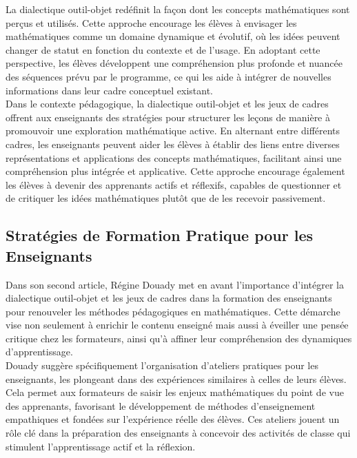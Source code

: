 La dialectique outil-objet redéfinit la façon dont les concepts mathématiques sont perçus et utilisés.
Cette approche encourage les élèves à envisager les mathématiques comme un domaine dynamique et évolutif,
où les idées peuvent changer de statut en fonction du contexte et de l'usage.
En adoptant cette perspective,
les élèves développent une compréhension plus profonde et nuancée des séquences prévu par le programme,
ce qui les aide à intégrer de nouvelles informations dans leur cadre conceptuel existant.\\

Dans le contexte pédagogique,
la dialectique outil-objet et les jeux de cadres offrent aux enseignants des stratégies pour structurer les leçons de manière à promouvoir une exploration mathématique active.
En alternant entre différents cadres,
les enseignants peuvent aider les élèves à établir des liens entre diverses représentations et applications des concepts mathématiques,
facilitant ainsi une compréhension plus intégrée et applicative.
Cette approche encourage également les élèves à devenir des apprenants actifs et réflexifs,
capables de questionner et de critiquer les idées mathématiques plutôt que de les recevoir passivement.

\subsection{Stratégies de Formation Pratique pour les Enseignants}

Dans son second article,
Régine Douady met en avant l'importance d'intégrer la dialectique outil-objet et les jeux de cadres dans la formation des enseignants pour renouveler les méthodes pédagogiques en mathématiques.
Cette démarche vise non seulement à enrichir le contenu enseigné mais aussi à éveiller une pensée critique chez les formateurs,
ainsi qu'à affiner leur compréhension des dynamiques d'apprentissage.\\

Douady suggère spécifiquement l'organisation d'ateliers pratiques pour les enseignants,
les plongeant dans des expériences similaires à celles de leurs élèves.
Cela permet aux formateurs de saisir les enjeux mathématiques du point de vue des apprenants,
favorisant le développement de méthodes d'enseignement empathiques et fondées sur l'expérience réelle des élèves.
Ces ateliers jouent un rôle clé dans la préparation des enseignants à concevoir des activités de classe qui stimulent l'apprentissage actif et la réflexion.\\

